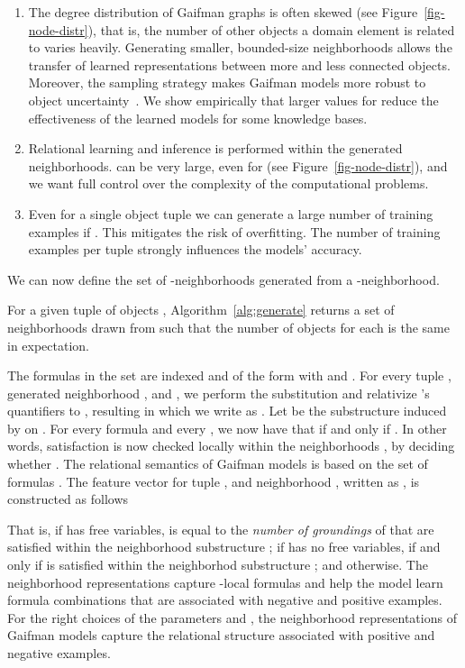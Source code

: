 \documentclass{article}
\begin{document}
\begin{enumerate}
\item The degree distribution of Gaifman graphs is often skewed (see Figure~\ref{fig-node-distr}), that is, the number of other objects a domain element is related to varies heavily. Generating smaller, bounded-size neighborhoods allows the transfer of learned representations between more and less connected objects. Moreover, the sampling strategy makes Gaifman models more robust to object uncertainty~\cite{Milch:2006}. We show empirically that larger values for  reduce the effectiveness of the learned models for some knowledge bases. 
\item Relational learning and inference is performed within the generated neighborhoods.  can be very large, even for  (see Figure~\ref{fig-node-distr}), and we want full control over the complexity of the computational problems. 
\item Even for a single object tuple  we can generate a large number of training examples if . This mitigates the risk of overfitting. The number of training examples per tuple strongly influences the models' accuracy. 
\end{enumerate}

We can now define the set of -neighborhoods generated from a -neighborhood. 







For a given tuple of objects , Algorithm~\ref{alg:generate} returns a set of  neighborhoods drawn from  such that the number of objects for each  is the same in expectation. 


The formulas in the set  are indexed and of the form  with  and . 
For every tuple , generated neighborhood , and , we perform the substitution  and relativize 's quantifiers to , resulting in  which we  write as .
Let  be the substructure induced by  on . For every formula  and every , we now have that  if and only if . In other words, satisfaction is now checked locally within the neighborhoods , by deciding whether .
The relational semantics of Gaifman models is based on the set of formulas . The feature vector  for tuple , and neighborhood , written as ,  is constructed as follows


That is, if   has free variables,  is equal to the \emph{number of groundings} of  that are satisfied within the neighborhood substructure ; if  has no free variables,  if and only if  is satisfied within the neighborhod substructure ; and  otherwise. The neighborhood representations  capture -local formulas and help the model learn formula combinations that are associated with negative and positive examples. For the right choices of the parameters  and , the neighborhood representations of Gaifman models capture the relational structure associated with positive and negative examples. 
\end{document}
